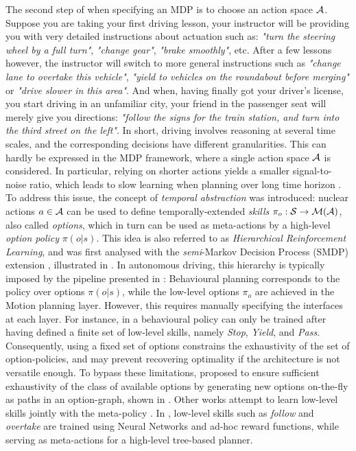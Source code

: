 The second step of when specifying an MDP is to choose an action space $\mathcal{A}$. Suppose you are taking your first driving lesson, your instructor will be providing you with very detailed instructions about actuation such as: \emph{"turn the steering wheel by a full turn"}, \emph{"change gear"}, \emph{"brake smoothly"}, etc. After a few lessons however, the instructor will switch to more general instructions such as \emph{"change lane to overtake this vehicle"}, \emph{"yield to vehicles on the roundabout before merging"} or \emph{"drive slower in this area"}. And when, having finally got your driver's license, you start driving in an unfamiliar city, your friend in the passenger seat will merely give you directions: \emph{"follow the signs for the train station, and turn into the third street on the left"}. In short, driving involves reasoning at several time scales, and the corresponding decisions have different granularities. This can hardly be expressed in the MDP framework, where a single action space $\mathcal{A}$ is considered. In particular, relying on shorter actions yields a smaller signal-to-noise ratio, which leads to slow learning when planning over long time horizon \citep{ShalevShwartz2017}. To address this issue, the concept of \emph{temporal abstraction} was introduced: nuclear actions $a\in\mathcal{A}$ can be used to define temporally-extended \emph{skills} $\pi_o:\mathcal{S} \rightarrow \mathcal{M}(\mathcal{A})$, also called \emph{options}, which in turn can be used as meta-actions by a high-level \emph{option policy} $\pi(o|s)$. This idea is also referred to as \emph{Hierarchical Reinforcement Learning}, and was first analysed with the \emph{semi}-Markov Decision Process (SMDP) extension \citep{Sutton1999}, illustrated in . In autonomous driving, this hierarchy is typically imposed by the pipeline presented in : Behavioural planning corresponds to the policy over options $\pi(o|s)$, while the low-level options $\pi_o$ are achieved in the Motion planning layer. However, this requires manually specifying the interfaces at each layer. For instance, in \citep{Barbier2018} a behavioural policy can only be trained after having defined a finite set of low-level skills, namely \emph{Stop}, \emph{Yield}, and \emph{Pass}. Consequently, using a fixed set of options constrains the exhaustivity of the set of option-policies, and may prevent recovering optimality if the architecture is not versatile enough. To bypass these limitations, \citet{ShalevShwartz2016} proposed to ensure sufficient exhaustivity of the class of available options by generating new options on-the-fly as paths in an option-graph, shown in . Other works attempt to learn low-level skills jointly with the meta-policy \citep{Bacon2017,Vezhnevets2017,Heess2016}. In \citep{Paxton2017}, low-level skills such as \emph{follow} and \emph{overtake} are trained using Neural Networks and ad-hoc reward functions, while serving as meta-actions for a high-level tree-based planner.

